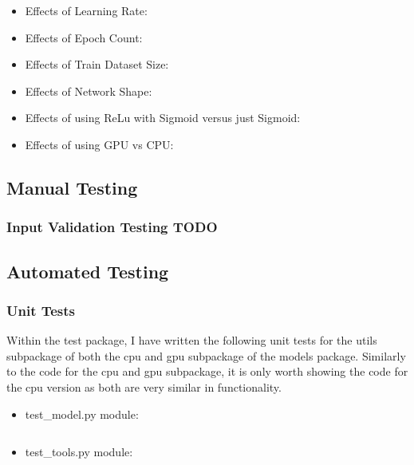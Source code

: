 \documentclass[./project-report/src/latex/project-report.tex]{subfiles}
\begin{document}
\begin{itemize}  %
    \item Effects of Learning Rate:
    \item Effects of Epoch Count:
    \item Effects of Train Dataset Size:
    \item Effects of Network Shape:
    \item Effects of using ReLu with Sigmoid versus just Sigmoid:
    \item Effects of using GPU vs CPU:
\end{itemize}

\subsection{Manual Testing}

\subsubsection{Input Validation Testing TODO}  %

\subsection{Automated Testing}

\subsubsection{Unit Tests}

Within the test package, I have written the following unit tests for the utils subpackage of both the cpu and gpu subpackage of the models package. Similarly to the code for the cpu 
and gpu subpackage, it is only worth showing the code for the cpu version as both are very similar in functionality.

\begin{itemize}
    \item test\_model.py module:
        \inputminted{python}{./school_project/test/models/cpu/utils/test_model.py}

        \pagebreak

    \item test\_tools.py module:
        \inputminted{python}{./school_project/test/models/cpu/utils/test_tools.py}
\end{itemize}

\inputminted{python}{./school_project/test/models/cpu.py}
\end{document}
